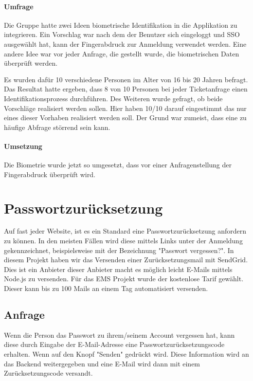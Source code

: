 \paragraph{Umfrage} Die Gruppe hatte zwei Ideen biometrische Identifikation in die Applikation zu integrieren. Ein Vorschlag war nach dem der Benutzer sich eingeloggt und SSO ausgewählt hat, kann der Fingerabdruck zur Anmeldung verwendet werden.
Eine andere Idee war vor jeder Anfrage, die gestellt wurde, die biometrischen Daten überprüft werden.

Es wurden dafür 10 verschiedene Personen im Alter von 16 bis 20 Jahren befragt. Das Resultat hatte ergeben, dass 8 von 10 Personen bei jeder Ticketanfrage einen Identifikationsprozess durchführen.
Des Weiteren wurde gefragt, ob beide Vorschläge realisiert werden sollen. Hier haben 10/10 darauf eingestimmt das nur eines dieser Vorhaben realisiert werden soll. Der Grund war zumeist, dass eine zu häufige Abfrage störrend sein kann.

\paragraph{Umsetzung} Die Biometrie wurde jetzt so umgesetzt, dass vor einer Anfragenstellung der Fingerabdruck überprüft wird.

\section{Passwortzurücksetzung}
Auf fast jeder Website, ist es ein Standard eine Passwortzurücksetzung anfordern zu können. In den meisten Fällen wird diese mittels Links unter der Anmeldung gekennzeichnet, beispielsweise mit der Bezeichnung "Passwort vergessen?".
In diesem Projekt haben wir das Versenden einer Zurücksetzungsmail mit SendGrid. Dies ist ein Anbieter dieser Anbieter macht es möglich leicht E-Mails mittels Node.js zu versenden.
Für das EMS Projekt wurde der kostenlose Tarif gewählt. Dieser kann bis zu 100 Mails an einem Tag automatisiert versenden.

\subsection{Anfrage}
Wenn die Person das Passwort zu ihrem/seinem Account vergessen hat, kann diese durch Eingabe der E-Mail-Adresse eine Passwortzurücksetzungscode erhalten. Wenn auf den Knopf "Senden" gedrückt wird.
Diese Information wird an das Backend weitergegeben und eine E-Mail wird dann mit einem Zurücksetzungscode versandt. 

